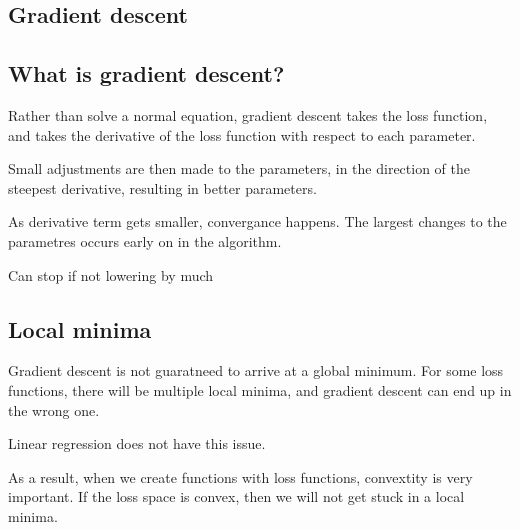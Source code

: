 
\subsection{Gradient descent}

\subsection{What is gradient descent?}

Rather than solve a normal equation, gradient descent takes the loss function, and takes the derivative of the loss function with respect to each parameter.

Small adjustments are then made to the parameters, in the direction of the steepest derivative, resulting in better parameters.

As derivative term gets smaller, convergance happens. The largest changes to the parametres occurs early on in the algorithm.

Can stop if not lowering by much

\subsection{Local minima}

Gradient descent is not guaratneed to arrive at a global minimum. For some loss functions, there will be multiple local minima, and gradient descent can end up in the wrong one.

Linear regression does not have this issue.

As a result, when we create functions with loss functions, convextity is very important. If the loss space is convex, then we will not get stuck in a local minima.

